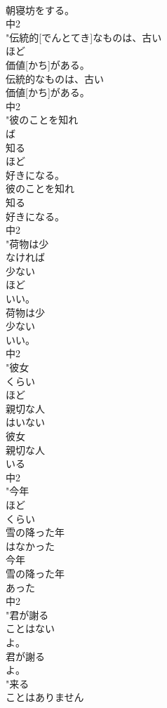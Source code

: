 \documentclass[8pt]{extreport}
\begin{document}
\begin{CJK}{UTF8}{min}
\\	朝寝坊をする。
\\	中2
\\	"伝統的[でんとてき]なものは、古い
\\	ほど
\\	価値[かち]がある。
\\	伝統的なものは、古い
\\	価値[かち]がある。
\\	中2
\\	"彼のことを知れ
\\	ば
\\	知る
\\	ほど
\\	好きになる。
\\	彼のことを知れ
\\	知る
\\	好きになる。
\\	中2
\\	"荷物は少
\\	なければ
\\	少ない
\\	ほど
\\	いい。
\\	荷物は少
\\	少ない
\\	いい。
\\	中2
\\	"彼女
\\	くらい
\\	ほど
\\	親切な人
\\	はいない
\\	彼女
\\	親切な人
\\	いる
\\	中2
\\	"今年
\\	ほど
\\	くらい
\\	雪の降った年
\\	はなかった
\\	今年
\\	雪の降った年
\\	あった
\\	中2
\\	"君が謝る
\\	ことはない
\\	よ。
\\	君が謝る
\\	よ。
\\	"来る
\\	ことはありません

\end{CJK}
\end{document}
